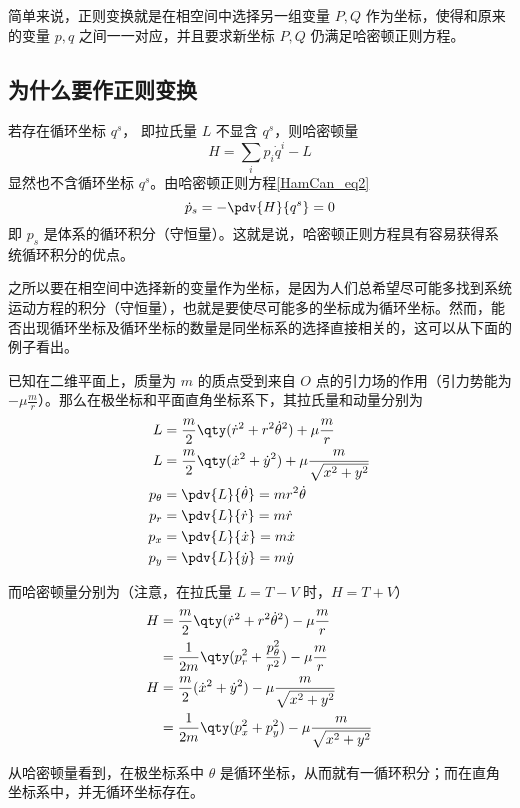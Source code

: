 
\begin{issues}
\issueDraft
\end{issues}

简单来说，正则变换就是在相空间中选择另一组变量 $P,Q$ 作为坐标，使得和原来的变量 $p,q$ 之间一一对应，并且要求新坐标 $P,Q$ 仍满足哈密顿正则方程。
\subsection{为什么要作正则变换}
若存在循环坐标 $q^s$， 即拉氏量 $L$ 不显含 $q^s$，则哈密顿量
\begin{equation}
H=\sum_i p_i\dot q^i-L
\end{equation}
显然也不含循环坐标 $q^s$。由哈密顿正则方程\autoref{HamCan_eq2}~
\begin{equation}
\dot p_s=-\pdv{H}{q^s}=0
\end{equation}
即 $p_s$ 是体系的循环积分（守恒量）。这就是说，哈密顿正则方程具有容易获得系统循环积分的优点。

之所以要在相空间中选择新的变量作为坐标，是因为人们总希望尽可能多找到系统运动方程的积分（守恒量），也就是要使尽可能多的坐标成为循环坐标。然而，能否出现循环坐标及循环坐标的数量是同坐标系的选择直接相关的，这可以从下面的例子看出。
\begin{example}{}
已知在二维平面上，质量为 $m$ 的质点受到来自 $O$ 点的引力场的作用（引力势能为 $-\mu\frac{m}{r}$）。那么在极坐标和平面直角坐标系下，其拉氏量和动量分别为
\begin{equation}
\begin{aligned}
L&=\frac{m}{2}\qty(\dot r^2+r^2\dot\theta^2)+\mu\frac{m}{r}\\
L&=\frac{m}{2}\qty(\dot x^2+\dot y^2)+\mu\frac{m}{\sqrt{x^2+y^2}}\\
p_\theta&=\pdv{L}{\dot \theta}=mr^2\dot\theta\\
p_r&=\pdv{L}{\dot r}=m\dot r\\
p_x&=\pdv{L}{\dot x}=m\dot x\\
p_y&=\pdv{L}{\dot y}=m\dot y
\end{aligned}
\end{equation}

而哈密顿量分别为（注意，在拉氏量 $L=T-V$ 时，$H=T+V$）
\begin{equation}
\begin{aligned}
H&=\frac{m}{2}\qty(\dot r^2+r^2\dot\theta^2)-\mu\frac{m}{r}\\
&=\frac{1}{2m}\qty(p_r^2+\frac{p_\theta^2}{r^2})-\mu\frac{m}{r}\\
H&=\frac{m}{2}(\dot x^2+\dot y^2)-\mu\frac{m}{\sqrt{x^2+y^2}}\\
&=\frac{1}{2m}\qty(p_x^2+p_y^2)-\mu\frac{m}{\sqrt{x^2+y^2}}
\end{aligned}
\end{equation}

从哈密顿量看到，在极坐标系中 $\theta$ 是循环坐标，从而就有一循环积分；而在直角坐标系中，并无循环坐标存在。 
\end{example}

